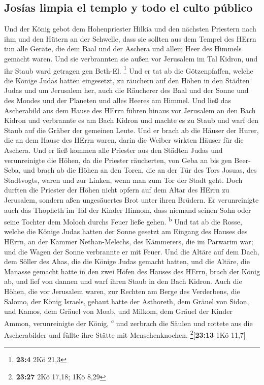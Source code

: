 \hypertarget{josuxedas-limpia-el-templo-y-todo-el-culto-puxfablico}{%
\subsection{Josías limpia el templo y todo el culto
público}\label{josuxedas-limpia-el-templo-y-todo-el-culto-puxfablico}}

 Und der König gebot dem Hohenpriester Hilkia und den
nächsten Priestern nach ihm und den Hütern an der Schwelle, dass sie
sollten aus dem Tempel des HErrn tun alle Geräte, die dem Baal und der
Aschera und allem Heer des Himmels gemacht waren. Und sie verbrannten
sie außen vor Jerusalem im Tal Kidron, und ihr Staub ward getragen gen
Beth-El. \footnote{\textbf{23:4} 2Kö 21,3}  Und er tat ab
die Götzenpfaffen, welche die Könige Judas hatten eingesetzt, zu
räuchern auf den Höhen in den Städten Judas und um Jerusalem her, auch
die Räucherer des Baal und der Sonne und des Mondes und der Planeten und
alles Heeres am Himmel.  Und ließ das Ascherabild aus dem
Hause des HErrn führen hinaus vor Jerusalem an den Bach Kidron und
verbrannte es am Bach Kidron und machte es zu Staub und warf den Staub
auf die Gräber der gemeinen Leute.  Und er brach ab die
Häuser der Hurer, die an dem Hause des HErrn waren, darin die Weiber
wirkten Häuser für die Aschera.  Und er ließ kommen alle
Priester aus den Städten Judas und verunreinigte die Höhen, da die
Priester räucherten, von Geba an bis gen Beer-Seba, und brach ab die
Höhen an den Toren, die an der Tür des Tors Josuas, des Stadtvogts,
waren und zur Linken, wenn man zum Tor der Stadt geht. 
Doch durften die Priester der Höhen nicht opfern auf dem Altar des HErrn
zu Jerusalem, sondern aßen ungesäuertes Brot unter ihren Brüdern.
 Er verunreinigte auch das Thopheth im Tal der Kinder
Hinnom, dass niemand seinen Sohn oder seine Tochter dem Moloch durchs
Feuer ließe gehen. \textsuperscript{b}  Und tat ab die
Rosse, welche die Könige Judas hatten der Sonne gesetzt am Eingang des
Hauses des HErrn, an der Kammer Nethan-Melechs, des Kämmerers, die im
Parwarim war; und die Wagen der Sonne verbrannte er mit Feuer.
 Und die Altäre auf dem Dach, dem Söller des Ahas, die
die Könige Judas gemacht hatten, und die Altäre, die Manasse gemacht
hatte in den zwei Höfen des Hauses des HErrn, brach der König ab, und
lief von dannen und warf ihren Staub in den Bach Kidron. 
Auch die Höhen, die vor Jerusalem waren, zur Rechten am Berge des
Verderbens, die Salomo, der König Israels, gebaut hatte der Asthoreth,
dem Gräuel von Sidon, und Kamos, dem Gräuel von Moab, und Milkom, dem
Gräuel der Kinder Ammon, verunreinigte der König, \textsuperscript{c}
 und zerbrach die Säulen und rottete aus die
Ascherabilder und füllte ihre Stätte mit Menschenknochen.
\footnote{\textbf{23:27} 2Kö 17,18; 1Kö 8,29}{[}\textbf{23:13} 1Kö
11,7{]}

